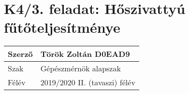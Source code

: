 
\section*{K4/3. feladat: Hőszivattyú fűtőteljesítménye}


\begin{tabular}{ | p{2cm} | p{14cm} | } 
	\hline
	Szerző & Török Zoltán D0EAD9 \\ 
	\hline
	Szak & Gépészmérnök alapszak \\ 
	\hline
	Félév & 2019/2020 II. (tavaszi) félév \\ 
	\hline
\end{tabular}
\vspace{0.5cm}

